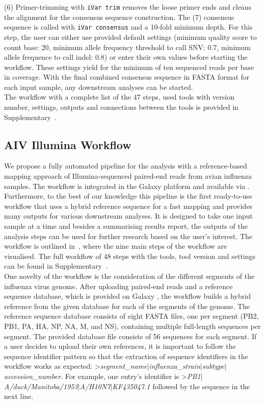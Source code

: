 (6) Primer-trimming with \texttt{iVar trim} removes the loose primer ends and cleans the alignment for the consensus sequence construction. The (7) consensus sequence is called with \texttt{iVar consensus} and a 10-fold minimum depth. For this step, the user can either use provided default settings (minimum quality score to count base: 20, minimum allele frequency threshold to call SNV: 0.7, minimum allele frequence to call indel: 0.8) or enter their own values before starting the workflow. These settings yield for the minimum of ten sequenced reads per base in coverage. With the final combined consensus sequence in FASTA format for each input sample, any downstream analyses can be started. \\
The workflow with a complete list of the 47 steps, used tools with version number, settings, outputs and connections between the tools is provided in Supplementary~. 

\subsection{AIV Illumina Workflow}\label{sec:aiv-wf}
We propose a fully automated pipeline for the analysis with a reference-based mapping approach of Illumina-sequenced paired-end reads from avian influenza samples. The workflow is integrated in the Galaxy platform and available via . Furthermore, to the best of our knowledge this pipeline is the first ready-to-use workflow that uses a hybrid reference sequence for a fast mapping and provides many outputs for various downstream analyses. It is designed to take one input sample at a time and besides a summarising results report, the outputs of the analysis steps can be used for further research based on the user's interest. The workflow is outlined in~, where the nine main steps of the workflow are visualised. The full workflow of 48 steps with the tools, tool version and settings can be found in Supplementary~. \\
One novelty of the workflow is the consideration of the different segments of the influenza virus genome. After uploading paired-end reads and a reference sequence database, which is provided on Galaxy , the workflow builds a hybrid reference from the given database for each of the segments of the genome. The reference sequence database consists of eight FASTA files, one per segment (PB2, PB1, PA, HA, NP, NA, M, and NS), containing multiple full-length sequences per segment. The provided database file consists of 56 sequences for each segment. If a user decides to upload their own references, it is important to follow the sequence identifier pattern so that the extraction of sequence identifiers in the workflow works as expected: >\textit{segment\_name$\mid$influenza\_strain$\mid$subtype$\mid$accession\_number}. For example, one entry's identifier is >\textit{PB1$\mid$A/duck/Manitoba/1953$\mid$A/H10N7$\mid$KF435047.1} followed by the sequence in the next line. 

